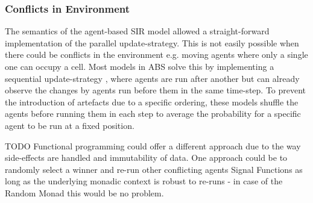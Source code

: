 \subsubsection{Conflicts in Environment}
The semantics of the agent-based SIR model allowed a straight-forward implementation of the parallel update-strategy. This is not easily possible when there could be conflicts in the environment e.g. moving agents where only a single one can occupy a cell. Most models in ABS \cite{epstein_growing_1996} solve this by implementing a sequential update-strategy \cite{thaler_art_2017}, where agents are run after another but can already observe the changes by agents run before them in the same time-step. To prevent the introduction of artefacts due to a specific ordering, these models shuffle the agents before running them in each step to average the probability for a specific agent to be run at a fixed position.

TODO
Functional programming could offer a different approach due to the way side-effects are handled and immutability of data. One approach could be to randomly select a winner and re-run other conflicting agents Signal Functions as long as the underlying monadic context is robust to re-runs - in case of the Random Monad this would be no problem.